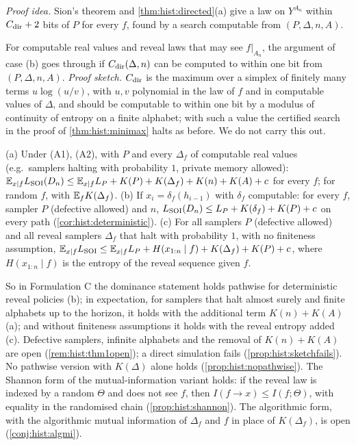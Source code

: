 \emph{Proof idea.} Sion's theorem \citep{sion1958general} and \cref{thm:hist:directed}(a) give a law on $Y^{A_n}$ within $C_{\rm dir}+2$ bits of $P$ for every $f$, found by a search computable from $(P,\Delta,n,A)$.

\begin{remark}\label{rem:hist:minimaxsketch}
For computable real values and reveal laws that may see $f|_{A_n}$, the argument of case (b) goes through if $C_{\rm dir}(\Delta,n)$ can be computed to within one bit from $(P,\Delta,n,A)$. \emph{Proof sketch.} $C_{\rm dir}$ is the maximum over a simplex of finitely many terms $u\log(u/v)$, with $u,v$ polynomial in the law of $f$ and in computable values of $\Delta$, and should be computable to within one bit by a modulus of continuity of entropy on a finite alphabet; with such a value the certified search in the proof of \cref{thm:hist:minimax} halts as before. We do not carry this out.
\end{remark}

\begin{corollary}\label{cor:hist:thm1}
(a) Under (A1), (A2), with $P$ and every $\Delta_f$ of computable real values (e.g.\ samplers halting with probability $1$, private memory allowed): $\mathbb{E}_{x\mid f}L_{\mathrm{SOI}}(D_n)\le\mathbb{E}_{x\mid f}L_P+K(P)+K(\Delta_f)+K(n)+K(A)+c$ for every $f$; for random $f$, with $\mathbb{E}_fK(\Delta_f)$.
(b) If $x_i=\delta_f(h_{i-1})$ with $\delta_f$ computable: for every $f$, sampler $P$ (defective allowed) and $n$, $L_{\mathrm{SOI}}(D_n)\le L_P+K(\delta_f)+K(P)+c$ on every path (\cref{cor:hist:deterministic}).
(c) For all samplers $P$ (defective allowed) and all reveal samplers $\Delta_f$ that halt with probability $1$, with no finiteness assumption, $\mathbb{E}_{x\mid f}L_{\mathrm{SOI}}\le\mathbb{E}_{x\mid f}L_P+H(x_{1:n}\mid f)+K(\Delta_f)+K(P)+c$, where $H(x_{1:n}\mid f)$ is the entropy of the reveal sequence given $f$.
\end{corollary}

So in Formulation C the dominance statement holds pathwise for deterministic reveal policies (b); in expectation, for samplers that halt almost surely and finite alphabets up to the horizon, it holds with the additional term $K(n)+K(A)$ (a); and without finiteness assumptions it holds with the reveal entropy added (c). Defective samplers, infinite alphabets and the removal of $K(n)+K(A)$ are open (\cref{rem:hist:thm1open}); a direct simulation fails (\cref{prop:hist:sketchfails}). No pathwise version with $K(\Delta)$ alone holds (\cref{prop:hist:nopathwise}). The Shannon form of the mutual-information variant holds: if the reveal law is indexed by a random $\Theta$ and does not see $f$, then $I(f\to x)\le I(f;\Theta)$, with equality in the randomised chain (\cref{prop:hist:shannon}). The algorithmic form, with the algorithmic mutual information of $\Delta_f$ and $f$ in place of $K(\Delta_f)$, is open (\cref{conj:hist:algmi}).

